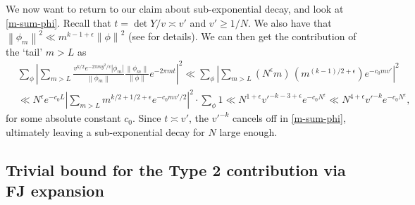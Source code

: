 \documentclass[11pt]{amsart}
\numberwithin{equation}{section}
\theoremstyle{plain}
\theoremstyle{definition}
\newcommand*{\norm}[1]{\left\lVert#1\right\rVert}
\newcommand{\sumn}{\sum \nolimits}
\begin{document}
We now want to return to our claim about sub-exponential decay, and look at \eqref{m-sum-phi}.
Recall that $t= \det Y/v \asymp v'$ and $v' \ge 1/N$. We also have that $\norm{\phi_m}^2\ll m^{k-1+\epsilon}\norm{\phi}^2$ (see \cite[Section 7.3.1]{PASD} for details). We can then get the contribution of the `tail' $m>L$ as
\begin{align}
    & \sum_\phi \left| \sum_{m > L}  \frac{v^{k/2} e^{- 2 \pi m y^2/v} |\phi_m|}{\norm{\phi_m}}  \frac{\norm{\phi_m}}{\norm{\phi}} e^{- 2 \pi m t} \right|^2 \ll \sum_\phi \left|  \sum_{m > L} (N^\epsilon m) \, (m^{ (k-1)/2+\epsilon} ) e^{- c_0 m v'} \right|^2 \\
    & \ll N^\epsilon e^{- c_0 L} | \sumn_{m > L} m^{k/2+1/2+\epsilon} e^{-  c_0 m v'/2}|^2  \cdot \sumn_\phi 1\ll N^{1+\epsilon} v'^{-k-3 +\epsilon} e^{-c_0 N^\epsilon}\ll N^{4+\epsilon} v'^{-k} e^{-c_0 N^\epsilon} ,\label{m-sum-tail-bd}
\end{align}
for some absolute constant $c_0$. Since $t \asymp v'$, the $v'^{-k}$ cancels off in \eqref{m-sum-phi}, ultimately leaving a sub-exponential decay for $N$ large enough.

\subsection{Trivial bound for the Type 2 contribution via FJ expansion} \label{triv-bd-type2}
\end{document}
